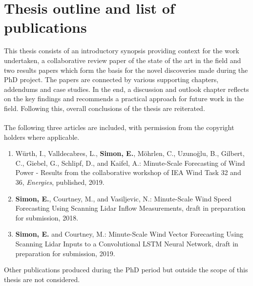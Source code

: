 \chapter{Thesis outline and list of publications}
\label{sec:outline}


This thesis consists of an introductory synopsis providing context for the work undertaken, a collaborative review paper of the state of the art in the field and two results papers which form the basis for the novel discoveries made during the PhD project. The papers are connected by various supporting chapters, addendums and case studies. In the end, a discussion and outlook chapter reflects on the key findings and recommends a practical approach for future work in the field. Following this, overall conclusions of the thesis are reiterated.
\\\\
The following three articles are included, with permission from the copyright holders where applicable.
\\
\begin{enumerate}
    \item W\"urth, I., Valldecabres, L., \textbf{Simon, E.}, M\"ohrlen, C., Uzuno\u glu, B., Gilbert, C., Giebel, G., Schlipf, D., and Kaifel, A.: Minute-Scale Forecasting of Wind Power - Results from the collaborative workshop of IEA Wind Task 32 and 36, \textit{Energies}, published, 2019.
    
    \item \textbf{Simon, E.}, Courtney, M., and Vasiljevic, N.: Minute-Scale Wind Speed Forecasting Using Scanning Lidar Inflow Measurements, draft in preparation for submission, 2018.
    
    \item \textbf{Simon, E.} and Courtney, M.: Minute-Scale Wind Vector Forecasting Using Scanning Lidar Inputs to a Convolutional LSTM Neural Network, draft in preparation for submission, 2019.

\end{enumerate}

\noindent
Other publications produced during the PhD period but outside the scope of this thesis are not considered.